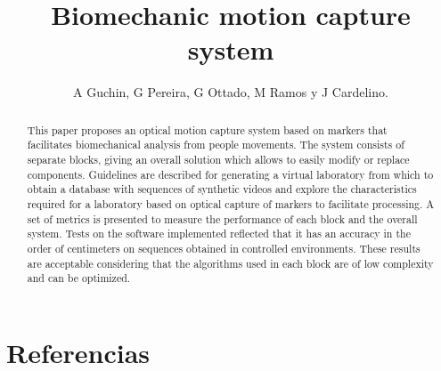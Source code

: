 \documentclass[a4paper]{jpconf}
\begin{document}
\title{Biomechanic motion capture system}

\author{A Guchin, G Pereira, G Ottado, M Ramos y J Cardelino.}

\address{Instituto de Ingenier\'ia El\'ectrica, Facultad de Ingeniería, Universidad de la Rep\'ublica, Uruguay.}

\begin{abstract}
This paper proposes an optical motion capture system based on markers that facilitates biomechanical analysis from people movements.
The system consists of separate blocks, giving an overall solution which allows to easily modify or replace components.
Guidelines are described for generating a virtual laboratory from which to obtain a database with sequences of synthetic videos and explore the characteristics required for a laboratory based on optical capture of markers to facilitate processing.
A set of metrics is presented to measure the performance of each block and the overall system.
Tests on the software implemented reflected that it has an accuracy in the order of centimeters on sequences obtained in controlled environments. These results are acceptable considering that the algorithms used in each block are of low complexity and can be optimized.
\end{abstract}








\section*{Referencias}


\end{document}
